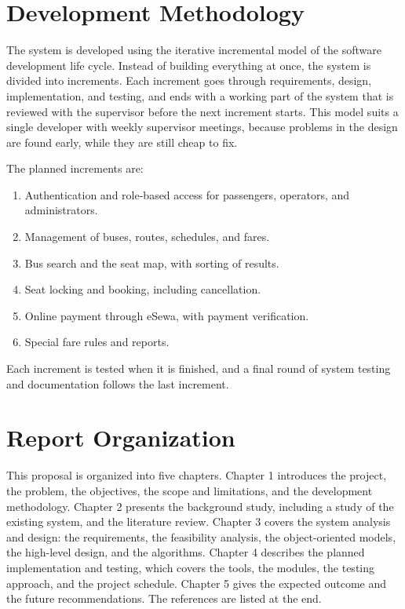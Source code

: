 \section{Development Methodology}\label{sec:devmethod}

The system is developed using the iterative incremental model of the software development life cycle. Instead of building everything at once, the system is divided into increments. Each increment goes through requirements, design, implementation, and testing, and ends with a working part of the system that is reviewed with the supervisor before the next increment starts. This model suits a single developer with weekly supervisor meetings, because problems in the design are found early, while they are still cheap to fix.

The planned increments are:
\begin{enumerate}
  \item Authentication and role-based access for passengers, operators, and administrators.
  \item Management of buses, routes, schedules, and fares.
  \item Bus search and the seat map, with sorting of results.
  \item Seat locking and booking, including cancellation.
  \item Online payment through eSewa, with payment verification.
  \item Special fare rules and reports.
\end{enumerate}

Each increment is tested when it is finished, and a final round of system testing and documentation follows the last increment.

\section{Report Organization}

This proposal is organized into five chapters. Chapter 1 introduces the project, the problem, the objectives, the scope and limitations, and the development methodology. Chapter 2 presents the background study, including a study of the existing system, and the literature review. Chapter 3 covers the system analysis and design: the requirements, the feasibility analysis, the object-oriented models, the high-level design, and the algorithms. Chapter 4 describes the planned implementation and testing, which covers the tools, the modules, the testing approach, and the project schedule. Chapter 5 gives the expected outcome and the future recommendations. The references are listed at the end.
